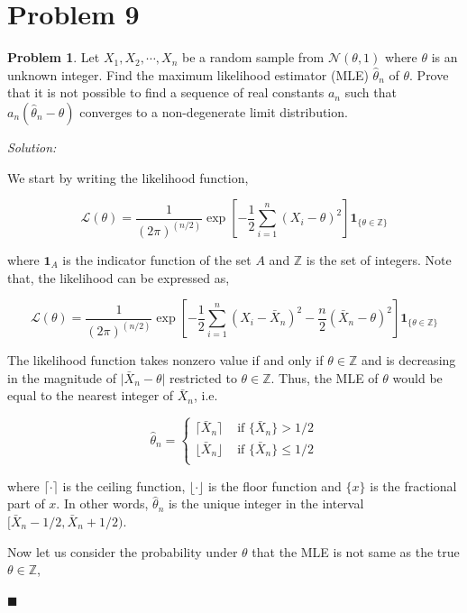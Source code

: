 \documentclass[12pt]{article}
\newcommand{\Z}{\mathbb{Z}}
\theoremstyle{definition}
\newtheorem*{prb}{Problem}
\newenvironment{problem}{\begin{tcolorbox}[colback=blue!5!white,colframe=blue!75!black, parbox = true] \begin{prb}  }{\end{prb}\end{tcolorbox} }
\newenvironment{answer}{\textit{Solution: }\quad }{ \hfill $\blacksquare$}
\numberwithin{equation}{section}
\begin{document}
\pagebreak
\section{Problem 9}

\begin{problem}
Let $X_1,X_2,\cdots,X_n$ be a random sample from $\mathcal{N}(\theta,1)$ where $\theta$ is an unknown integer. Find the maximum likelihood estimator (MLE) $\hat{\theta}_n$ of $\theta$. Prove that it is not possible to find a sequence of real constants $a_n$ such that $a_n\left(\hat{\theta}_n-\theta\right)$ converges to a non-degenerate limit distribution.
\end{problem}

\begin{answer}
    
    We start by writing the likelihood function,

    $$
    \mathcal{L}(\theta) = \dfrac{1}{(2\pi)^{(n/2)}} \exp\left[ -\dfrac{1}{2} \sum_{i=1}^{n} (X_i - \theta)^2 \right] \bm{1}_{ \{\theta \in \Z\} }
    $$

    where $\bm{1}_{A}$ is the indicator function of the set $A$ and $\Z$ is the set of integers. Note that, the likelihood can be expressed as,

    $$
    \mathcal{L}(\theta) = \dfrac{1}{(2\pi)^{(n/2)}} \exp\left[ -\dfrac{1}{2} \sum_{i=1}^{n} (X_i - \bar{X}_n)^2 - \dfrac{n}{2} (\bar{X}_n - \theta)^2 \right] \bm{1}_{ \{\theta \in \Z\} }
    $$
    
    The likelihood function takes nonzero value if and only if $\theta \in \Z$ and is decreasing in the magnitude of $\vert \bar{X}_n - \theta \vert$ restricted to $\theta \in \Z$. Thus, the MLE of $\theta$ would be equal to the nearest integer of $\bar{X}_n$, i.e.

    $$
    \widehat{\theta}_n = \begin{cases}
        \lceil \bar{X}_n \rceil & \text{ if } \{ \bar{X}_n \} > 1/2\\
        \lfloor \bar{X}_n \rfloor & \text{ if } \{ \bar{X}_n \} \leq 1/2\\
    \end{cases}
    $$

    where $\lceil \cdot \rceil$ is the ceiling function, $\lfloor \cdot \rfloor$ is the floor function and $\{ x\}$ is the fractional part of $x$. In other words, $\widehat{\theta}_n$ is the unique integer in the interval $[\bar{X}_n - 1/2, \bar{X}_n + 1/2)$.

    Now let us consider the probability under $\theta$ that the MLE is not same as the true $\theta \in \Z$, 


\end{answer}
\end{document}
